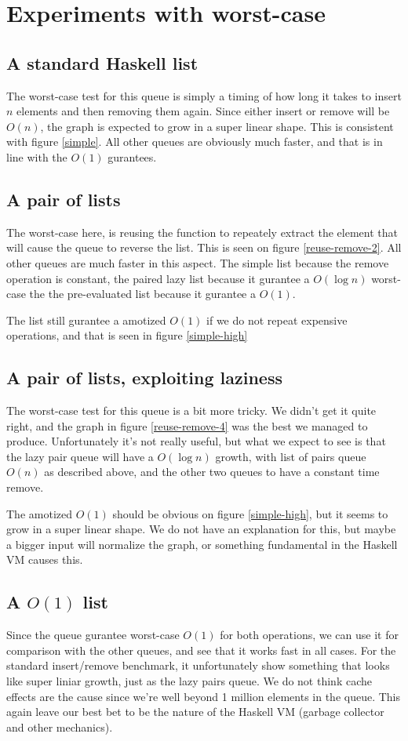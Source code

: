 \section*{Experiments with worst-case}

\subsection*{A standard Haskell list}
The worst-case test for this queue is simply a timing of how long it takes to insert $n$ elements and then removing them again. Since either insert or remove will be $O(n)$, the graph is expected to grow in a super linear shape. This is consistent with figure \ref{simple}. All other queues are obviously much faster, and that is in line with the $O(1)$ gurantees.

\subsection*{A pair of lists}
The worst-case here, is reusing the function to repeately extract the element that will cause the queue to reverse the list. This is seen on figure \ref{reuse-remove-2}. All other queues are much faster in this aspect. The simple list because the remove operation is constant, the paired lazy list because it gurantee a $O(\log n)$ worst-case the the pre-evaluated list because it gurantee a $O(1)$.

The list still gurantee a amotized $O(1)$ if we do not repeat expensive operations, and that is seen in figure \ref{simple-high}

\subsection*{A pair of lists, exploiting laziness}
The worst-case test for this queue is a bit more tricky. We didn't get it quite right, and the graph in figure \ref{reuse-remove-4} was the best we managed to produce. Unfortunately it's not really useful, but what we expect to see is that the lazy pair queue will have a $O(\log n)$ growth, with list of pairs queue $O(n)$ as described above, and the other two queues to have a constant time remove.

The amotized $O(1)$ should be obvious on figure \ref{simple-high}, but it seems to grow in a super linear shape. We do not have an explanation for this, but maybe a bigger input will normalize the graph, or something fundamental in the Haskell VM causes this.

\subsection*{A $O(1)$ list}
Since the queue gurantee worst-case $O(1)$ for both operations, we can use it for comparison with the other queues, and see that it works fast in all cases. For the standard insert/remove benchmark, it unfortunately show something that looks like super liniar growth, just as the lazy pairs queue. We do not think cache effects are the cause since we're well beyond 1 million elements in the queue. This again leave our best bet to be the nature of the Haskell VM (garbage collector and other mechanics).


